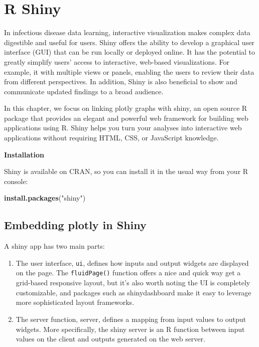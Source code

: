 \documentclass[]{book}
\newenvironment{Shaded}{\begin{snugshade}}{\end{snugshade}}
\newcommand{\KeywordTok}[1]{\textcolor[rgb]{0.13,0.29,0.53}{\textbf{#1}}}
\newcommand{\StringTok}[1]{\textcolor[rgb]{0.31,0.60,0.02}{#1}}
\newcommand{\NormalTok}[1]{#1}
\begin{document}
\chapter{R Shiny}\label{shiny}

In infectious disease data learning, interactive visualization makes
complex data digestible and useful for users. Shiny offers the ability
to develop a graphical user interface (GUI) that can be run locally or
deployed online. It has the potential to greatly simplify users' access
to interactive, web-based visualizations. For example, it with multiple
views or panels, enabling the users to review their data from different
perspectives. In addition, Shiny is also beneficial to show and
communicate updated findings to a broad audience.

In this chapter, we focus on linking plotly graphs with shiny, an open
source R package that provides an elegant and powerful web framework for
building web applications using R. Shiny helps you turn your analyses
into interactive web applications without requiring HTML, CSS, or
JavaScript knowledge.

\textbf{Installation}

Shiny is available on CRAN, so you can install it in the usual way from
your R console:

\begin{Shaded}
\begin{Highlighting}[]
\KeywordTok{install.packages}\NormalTok{(}\StringTok{"shiny"}\NormalTok{)}
\end{Highlighting}
\end{Shaded}

\section{Embedding plotly in Shiny}\label{embedding-plotly-in-shiny}

A shiny app has two main parts:

\begin{enumerate}
\def\labelenumi{\arabic{enumi}.}
\item
  The user interface, \texttt{ui}, defines how inputs and output widgets
  are displayed on the page. The \texttt{fluidPage()} function offers a
  nice and quick way get a grid-based responsive layout, but it's also
  worth noting the UI is completely customizable, and packages such as
  shinydashboard make it easy to leverage more sophisticated layout
  frameworks.
\item
  The server function, server, defines a mapping from input values to
  output widgets. More specifically, the shiny server is an R function
  between input values on the client and outputs generated on the web
  server.
\end{enumerate}
\end{document}
